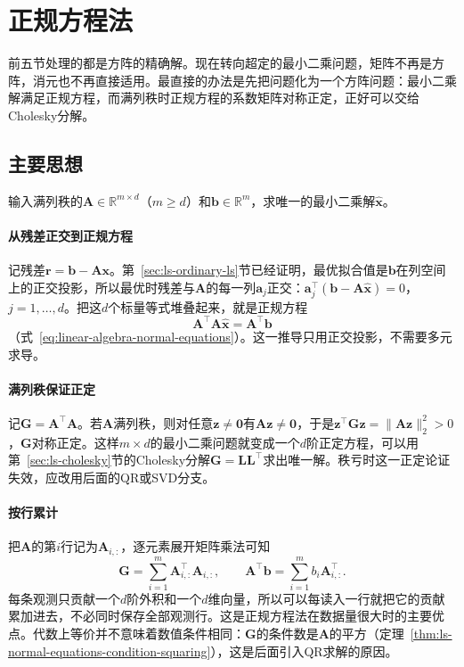 \section{正规方程法}
\label{sec:ls-normal-equations-method}

前五节处理的都是方阵的精确解。现在转向超定的最小二乘问题，矩阵不再是方阵，消元也不再直接适用。最直接的办法是先把问题化为一个方阵问题：最小二乘解满足正规方程，而满列秩时正规方程的系数矩阵对称正定，正好可以交给Cholesky分解。

\subsection{主要思想}

输入满列秩的$\bm A\in\mathbb R^{m\times d}$（$m\geq d$）和$\bm b\in\mathbb R^m$，求唯一的最小二乘解$\hat{\bm x}$。

\paragraph{从残差正交到正规方程}
记残差$\bm r=\bm b-\bm A\bm x$。第~\ref{sec:ls-ordinary-ls}节已经证明，最优拟合值是$\bm b$在列空间上的正交投影，所以最优时残差与$\bm A$的每一列$\bm a_j$正交：$\bm a_j^\top(\bm b-\bm A\hat{\bm x})=0$，$j=1,\ldots,d$。把这$d$个标量等式堆叠起来，就是正规方程
\[
 \bm A^\top\bm A\hat{\bm x}=\bm A^\top\bm b
\]
（式~\eqref{eq:linear-algebra-normal-equations}）。这一推导只用正交投影，不需要多元求导。

\paragraph{满列秩保证正定}
记$\bm G=\bm A^\top\bm A$。若$\bm A$满列秩，则对任意$\bm z\neq\bm0$有$\bm A\bm z\neq\bm0$，于是$\bm z^\top\bm G\bm z=\lVert\bm A\bm z\rVert_2^2>0$，$\bm G$对称正定。这样$m\times d$的最小二乘问题就变成一个$d$阶正定方程，可以用第~\ref{sec:ls-cholesky}节的Cholesky分解$\bm G=\bm L\bm L^\top$求出唯一解。秩亏时这一正定论证失效，应改用后面的QR或SVD分支。

\paragraph{按行累计}
把$\bm A$的第$i$行记为$\bm A_{i,:}$，逐元素展开矩阵乘法可知
\[
 \bm G=\sum_{i=1}^m\bm A_{i,:}^\top\bm A_{i,:},\qquad
 \bm A^\top\bm b=\sum_{i=1}^mb_i\bm A_{i,:}^\top .
\]
每条观测只贡献一个$d$阶外积和一个$d$维向量，所以可以每读入一行就把它的贡献累加进去，不必同时保存全部观测行。这是正规方程法在数据量很大时的主要优点。代数上等价并不意味着数值条件相同：$\bm G$的条件数是$\bm A$的平方（定理~\ref{thm:ls-normal-equations-condition-squaring}），这是后面引入QR求解的原因。

